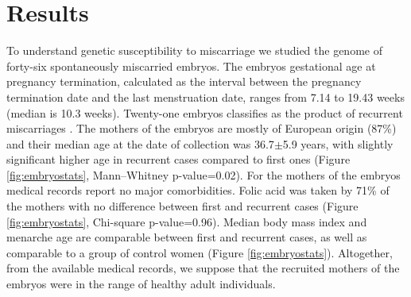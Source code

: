 \section*{Results}


To understand genetic susceptibility to miscarriage we studied the genome of forty-six spontaneously miscarried embryos. The embryos gestational age at pregnancy termination, calculated as the interval between the pregnancy termination date and the last menstruation date, ranges from 7.14 to 19.43 weeks (median is 10.3 weeks). Twenty-one embryos classifies as the product of recurrent miscarriages \cite{eshre2018eshre}. The mothers of the embryos are mostly of European origin (87\%) and their median age at the date of collection was 36.7$\pm$5.9 years, with slightly significant higher age in recurrent cases compared to first ones (Figure \ref{fig:embryostats}, Mann–Whitney p-value=0.02). For the mothers of the embryos medical records report no major comorbidities. Folic acid was taken by 71\% of the mothers with no difference between first and recurrent cases (Figure \ref{fig:embryostats}, Chi-square p-value=0.96). Median body mass index and menarche age are comparable between first and recurrent cases, as well as comparable to a group of control women (Figure \ref{fig:embryostats}). Altogether, from the available medical records, we suppose that the recruited mothers of the embryos were in the range of healthy adult individuals. %

